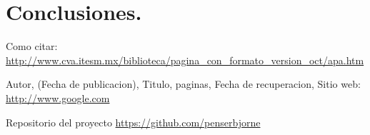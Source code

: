 \documentclass[a4paper,11pt]{article}                 %
\begin{document}
\section{Conclusiones.}
  \begin{thebibliography}{}                           %
      Como citar: \url{http://www.cva.itesm.mx/biblioteca/pagina_con_formato_version_oct/apa.htm} %

      Autor,
      (Fecha de publicacion),
      Titulo, paginas,
      Fecha de recuperacion,
      Sitio web: \url{http://www.google.com}

      Repositorio del proyecto \url{https://github.com/penserbjorne}
  \end{thebibliography}

\end{document}
